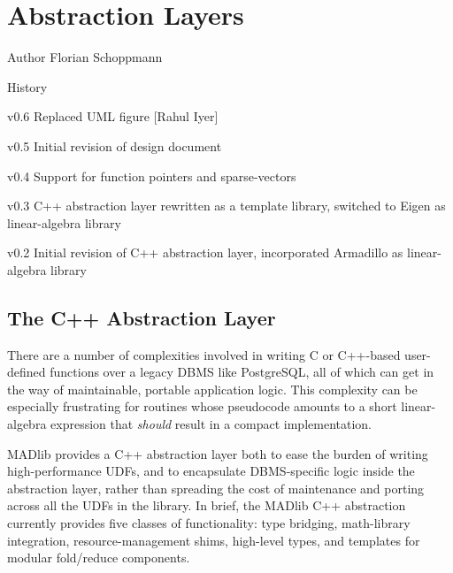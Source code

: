 
\chapter{Abstraction Layers}

\begin{moduleinfo}
\item[Author] Florian Schoppmann
\item[History]
	\begin{modulehistory}
		\item[v0.6] Replaced UML figure [Rahul Iyer]
		\item[v0.5] Initial revision of design document
		\item[v0.4] Support for function pointers and sparse-vectors
		\item[v0.3] C++ abstraction layer rewritten as a template library, switched to Eigen \cite{eigen} as linear-algebra library
		\item[v0.2] Initial revision of C++ abstraction layer, incorporated Armadillo \cite{armadillo} as linear-algebra library
	\end{modulehistory}
\end{moduleinfo}


\section{The C++ Abstraction Layer}

There are a number of complexities involved in writing C or C++-based user-defined functions over a legacy DBMS like PostgreSQL, all of which can get in the way of maintainable, portable application logic. This complexity can be especially frustrating for routines whose pseudocode amounts to a short linear-algebra expression that \emph{should} result in a compact implementation.

MADlib provides a C++ abstraction layer both to ease the burden of writing high-performance UDFs, and to encapsulate DBMS-specific logic inside the abstraction layer, rather than spreading the cost of maintenance and porting across all the UDFs in the library. In brief, the MADlib C++ abstraction currently provides five classes of functionality: type bridging, math-library integration, resource-management shims, high-level types, and templates for modular fold/reduce components.

